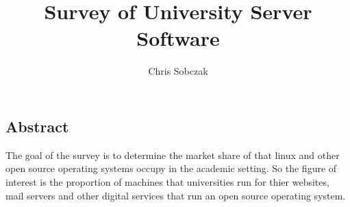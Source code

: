 \documentclass{article}
\author{Chris Sobczak}
\title{Survey of University Server Software}
\theoremstyle{definition}
\begin{document}
\begin{titlepage}
\maketitle

\vspace*{\fill}

\section{Abstract}
The goal of the survey is to determine the market share
of that linux and other open source operating systems
occupy in the academic setting. So the
figure of interest is the proportion of machines that
universities run for thier websites, mail servers and other
digital services that run an open source operating system.

\end{titlepage}
\end{document}
